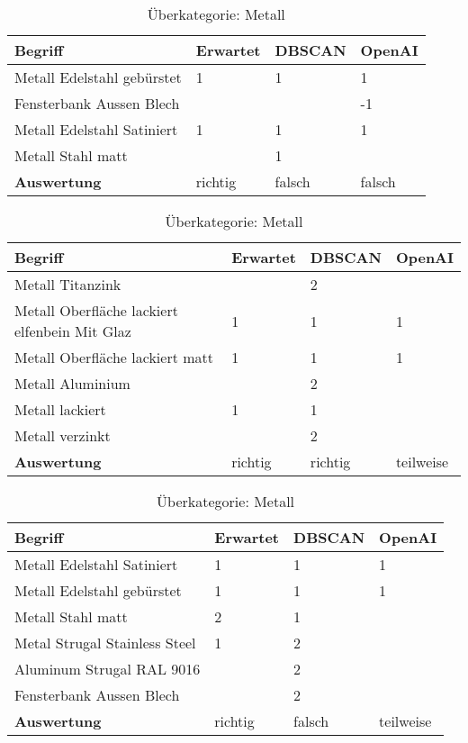 \begin{table}[h]
	
	\centering
	\begin{tabular}{|l|l|l|l|}
		\hline
		\textbf{Begriff} & \textbf{Erwartet} & \textbf{DBSCAN} & \textbf{OpenAI}\\ \hline
		        Metall Edelstahl gebürstet & 1 & 1 & 1 \\ \hline
		Fensterbank Aussen Blech & ~ & ~ & -1 \\ \hline
		Metall Edelstahl Satiniert & 1 & 1 & 1 \\ \hline
		Metall Stahl matt & ~ & 1 & ~ \\ \hline
		\textbf{Auswertung} & richtig & falsch & falsch \\ \hline
	\end{tabular}
	\caption{Überkategorie: Metall}
	\label{t:evaluation-example8}
\end{table}

\begin{table}[h]
	
	\centering
	\begin{tabular}{|l|l|l|l|}
		\hline
		\textbf{Begriff} & \textbf{Erwartet} & \textbf{DBSCAN} & \textbf{OpenAI}\\ \hline
		   Metall Titanzink & ~ & 2 & ~ \\ \hline
		Metall Oberfläche lackiert elfenbein Mit Glaz & 1 & 1 & 1 \\ \hline
		Metall Oberfläche lackiert matt & 1 & 1 & 1 \\ \hline
		Metall Aluminium & ~ & 2 & ~ \\ \hline
		Metall lackiert & 1 & 1 & ~ \\ \hline
		Metall verzinkt & ~ & 2 & ~ \\ \hline
		\textbf{Auswertung} & richtig & richtig & teilweise \\ \hline
	\end{tabular}
	\caption{Überkategorie: Metall}
	\label{t:evaluation-example9}
\end{table}

\begin{table}[h]
	
	\centering
	\begin{tabular}{|l|l|l|l|}
		\hline
		\textbf{Begriff} & \textbf{Erwartet} & \textbf{DBSCAN} & \textbf{OpenAI}\\ \hline
		  Metall Edelstahl Satiniert & 1 & 1 & 1 \\ \hline
		Metall Edelstahl gebürstet & 1 & 1 & 1 \\ \hline
		Metall Stahl matt & 2 & 1 & ~ \\ \hline
		Metal Strugal Stainless Steel & 1 & 2 & ~ \\ \hline
		Aluminum Strugal RAL 9016 & ~ & 2 & ~ \\ \hline
		Fensterbank Aussen Blech & ~ & 2 & ~ \\ \hline
		\textbf{Auswertung} & richtig & falsch & teilweise \\ \hline
	\end{tabular}
	\caption{Überkategorie: Metall}
	\label{t:evaluation-example10}
\end{table}

